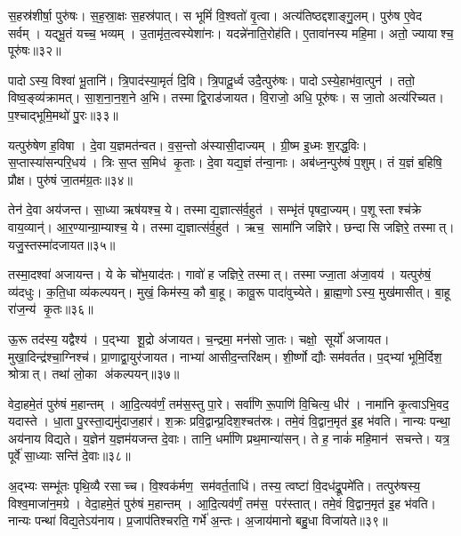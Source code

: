 स॒हस्र॑शीर्\mbox{}षा॒ पुरु॑षः। स॒ह॒स्रा॒क्षः स॒हस्र॑पात्। स भूमिं॑ वि॒श्वतो॑ वृ॒त्वा। अत्य॑तिष्ठद्दशाङ्गु॒लम्। पुरु॑ष ए॒वेद सर्वम्। यद्भू॒तं यच्च॒ भव्यम्। उ॒तामृ॑त॒त्वस्येशा॑नः। यदन्ने॑नाति॒रोह॑ति। ए॒तावा॑नस्य महि॒मा। अतो॒ ज्यायाश्च॒ पूरु॑षः॥३२॥

पादोऽस्य॒ विश्वा॑ भू॒तानि॑। त्रि॒पाद॑स्या॒मृतं॑ दि॒वि। त्रि॒पादू॒र्ध्व उदै॒त्पुरु॑षः। पादोऽस्ये॒हाभ॑वा॒त्पुन॑। ततो॒ विष्व॒ङ्व्य॑क्रामत्। सा॒श॒ना॒न॒श॒ने अ॒भि। तस्माद्वि॒राड॑जायत। वि॒राजो॒ अधि॒ पूरु॑षः। स जा॒तो अत्य॑रिच्यत। प॒श्चाद्भूमि॒मथो॑ पु॒रः॥३३॥

यत्पुरु॑षेण ह॒विषा। दे॒वा य॒ज्ञमत॑न्वत। व॒स॒न्तो अ॑स्यासी॒दाज्यम्। ग्री॒ष्म इ॒ध्मः  श॒रद्ध॒विः। स॒प्तास्या॑सन्परि॒\-धय॑। त्रिः स॒प्त स॒मिध॑ कृ॒ताः। दे॒वा यद्य॒ज्ञं त॑न्वा॒नाः। अब॑ध्न॒न्पुरु॑षं प॒शुम्। तं य॒ज्ञं ब॒\ar{}हिषि॒ प्रौक्ष\sn{}। पुरु॑षं जा॒तम॑ग्र॒तः॥३४॥

तेन॑ दे॒वा अय॑जन्त। सा॒ध्या ऋष॑यश्च॒ ये। तस्माद्य॒ज्ञात्स॑र्व॒हुत॑। सम्भृ॑तं पृषदा॒ज्यम्। प॒शूस्ताश्च॑क्रे वाय॒व्यान्॑। आ॒र॒ण्यान्ग्रा॒म्याश्च॒ ये। तस्माद्य॒ज्ञात्स॑र्व॒हुत॑। ऋच॒ सामा॑नि जज्ञिरे। छन्दासि जज्ञिरे॒ तस्मात्। यजु॒स्तस्मा॑दजायत॥३५॥

तस्मा॒दश्वा॑ अजायन्त। ये के चो॑भ॒याद॑तः। गावो॑ ह जज्ञिरे॒ तस्मात्। तस्माज्जा॒ता अ॑जा॒वय॑। यत्पुरु॑षं॒ व्य॑दधुः। क॒ति॒धा व्य॑कल्पयन्। मुखं॒ किम॑स्य॒ कौ बा॒हू। कावू॒रू पादा॑वुच्येते। ब्रा॒ह्म॒णोऽस्य॒ मुख॑मासीत्। बा॒हू रा॑ज॒न्य॑ कृ॒तः॥३६॥

ऊ॒रू तद॑स्य॒ यद्वैश्य॑। प॒द्भ्या शू॒द्रो अ॑जायत। च॒न्द्रमा॒ मन॑सो जा॒तः। चक्षो॒ सूर्यो॑ अजायत। मुखा॒दिन्द्र॑श्चा॒ग्निश्च॑। प्रा॒णाद्वा॒युर॑जायत। नाभ्या॑ आसीद॒न्तरि॑क्षम्। शी॒र्ष्णो द्यौः सम॑वर्तत। प॒द्भ्यां भूमि॒र्दिश॒ श्रोत्रात्। तथा॑ लो॒का अ॑कल्पयन्॥३७॥

वेदा॒हमे॒तं पुरु॑षं म॒हान्तम्। आ॒दि॒त्यव॑र्णं॒ तम॑स॒स्तु पा॒रे। सर्वा॑णि रू॒पाणि॑ वि॒चित्य॒ धीर॑। नामा॑नि कृ॒त्वाऽभि॒वद॒\an{} यदास्ते। धा॒ता पु॒रस्ता॒द्यमु॑दाज॒हार॑। श॒क्रः प्रवि॒द्वान्प्र॒दिश॒श्चत॑स्रः। तमे॒वं वि॒द्वान॒मृत॑ इ॒ह भ॑वति। नान्यः पन्था॒ अय॑नाय विद्यते। य॒ज्ञेन॑ य॒ज्ञम॑यजन्त दे॒वाः। तानि॒ धर्मा॑णि प्रथ॒मान्या॑सन्। ते ह॒ नाकं॑ महि॒मान॑ सचन्ते। यत्र॒ पूर्वे॑ सा॒ध्याः सन्ति॑ दे॒वाः॥३८॥

अ॒द्भ्यः सम्भू॑तः पृथि॒व्यै रसाच्च। वि॒श्वक॑र्मण॒ सम॑वर्त॒ताधि॑। तस्य॒ त्वष्टा॑ वि॒दध॑द्रू॒पमे॑ति। तत्पुरु॑षस्य॒ विश्व॒माजा॑न॒मग्रे। वेदा॒हमे॒तं पुरु॑षं म॒हान्तम्। आ॒दि॒त्यव॑र्णं॒ तम॑स॒ पर॑स्तात्। तमे॒वं वि॒द्वान॒मृत॑ इ॒ह भ॑वति। नान्यः पन्था॑ विद्य॒तेऽय॑नाय। प्र॒जाप॑तिश्चरति॒ गर्भे॑ अ॒न्तः। अ॒जाय॑मानो बहु॒धा विजा॑यते॥३९॥

